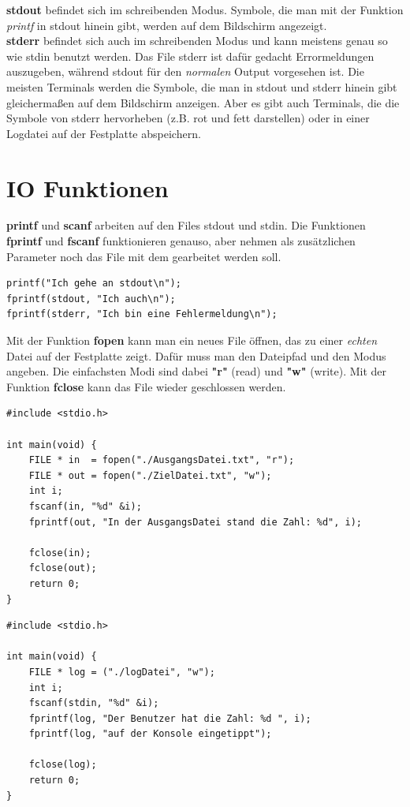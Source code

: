 \documentclass[c_worksheet.tex]{subfiles}
\begin{document}
\textbf{stdout} befindet sich im schreibenden Modus. Symbole, die man mit der Funktion \textit{printf} in stdout hinein gibt, werden auf dem Bildschirm angezeigt.\\
\textbf{stderr} befindet sich auch im schreibenden Modus und kann meistens genau so wie stdin benutzt werden. Das File stderr ist dafür gedacht Errormeldungen auszugeben, während stdout für den \textit{normalen} Output vorgesehen ist. Die meisten Terminals werden die Symbole, die man in stdout und stderr hinein gibt gleichermaßen auf dem Bildschirm anzeigen. Aber es gibt auch Terminals, die die Symbole von stderr hervorheben (z.B. rot und fett darstellen) oder in einer Logdatei auf der Festplatte abspeichern.

\section{IO Funktionen}

\textbf{printf} und \textbf{scanf} arbeiten auf den Files stdout und stdin. Die Funktionen \textbf{fprintf} und \textbf{fscanf} funktionieren genauso, aber nehmen als zusätzlichen Parameter noch das File mit dem gearbeitet werden soll.

\begin{lstlisting}[numbers=none]
printf("Ich gehe an stdout\n");
fprintf(stdout, "Ich auch\n");
fprintf(stderr, "Ich bin eine Fehlermeldung\n");
\end{lstlisting}

Mit der Funktion \textbf{fopen} kann man ein neues File öffnen, das zu einer \textit{echten} Datei auf der Festplatte zeigt. Dafür muss man den Dateipfad und den Modus angeben. Die einfachsten Modi sind dabei \textbf{"r"} (read) und \textbf{"w"} (write). Mit der Funktion \textbf{fclose} kann das File wieder geschlossen werden.

\begin{lstlisting}
#include <stdio.h>

int main(void) {
    FILE * in  = fopen("./AusgangsDatei.txt", "r");
    FILE * out = fopen("./ZielDatei.txt", "w");
    int i;
    fscanf(in, "%d" &i);
    fprintf(out, "In der AusgangsDatei stand die Zahl: %d", i);

    fclose(in);
    fclose(out);
    return 0;
}
\end{lstlisting}

\begin{lstlisting}
#include <stdio.h>

int main(void) {
    FILE * log = ("./logDatei", "w");
    int i;
    fscanf(stdin, "%d" &i);
    fprintf(log, "Der Benutzer hat die Zahl: %d ", i);
    fprintf(log, "auf der Konsole eingetippt");

    fclose(log);
    return 0;
}
\end{lstlisting}
\end{document}
